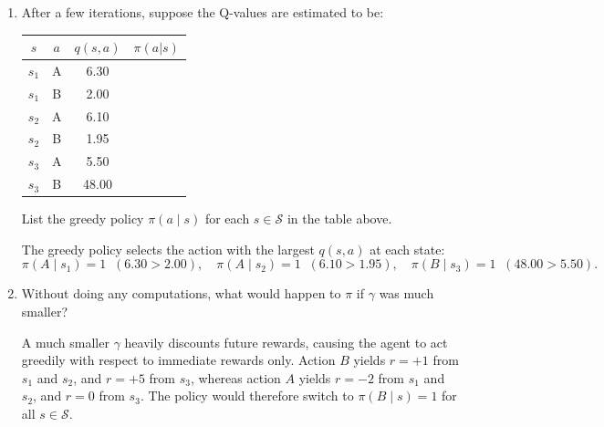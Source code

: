 \begin{enumerate}
\begin{solution}
\medskip
\noindent\textbf{Step 2: $q(s,a;0)$ from $q(\cdot;1)$.}

The greedy values at $t=1$ are:
\[
  \max_{a'} q(s_1, a'; 1) = \max(-2, 1) = 1, \quad
  \max_{a'} q(s_2, a'; 1) = 1, \quad
  \max_{a'} q(s_3, a'; 1) = \max(0, 5) = 5.
\]
\begin{align*}
  q(s_1, A; 0) &= -2 + 0.9\cdot 5 = -2 + 4.5 = 2.5 \\
  q(s_1, B; 0) &= \tfrac{1}{2}(1 + 0.9\cdot 1) + \tfrac{1}{2}(1 + 0.9\cdot 1) = 1.9 \\
  q(s_2, A; 0) &= -2 + 0.9\cdot 5 = 2.5 \\
  q(s_2, B; 0) &= \tfrac{1}{2}(1 + 0.9\cdot 1) + \tfrac{1}{2}(1 + 0.9\cdot 1) = 1.9 \\
  q(s_3, A; 0) &= 0 + 0.9\cdot\max_{a'} q(s_2, a'; 1) = 0.9\cdot 1 = 0.9 \\
  q(s_3, B; 0) &= 5 + 0.9\cdot\max_{a'} q(s_3, a'; 1) = 5 + 0.9\cdot 5 = 9.5
\end{align*}
\end{solution}

\item \points[2] After a few iterations, suppose the Q-values are estimated to be:
\renewcommand{\arraystretch}{1.7}
\setlength{\tabcolsep}{10pt}
\begin{table}[H]
  \centering
  \begin{tabular}{|c|c|c|c|}
    \hline
    $s$ & $a$ & $q(s,a)$ & $\pi(a|s)$\\\hline
    $s_1$ & A & 6.30 & \\\hline
    $s_1$ & B & 2.00 & \\\hline
    $s_2$ & A & 6.10 & \\\hline
    $s_2$ & B & 1.95 & \\\hline
    $s_3$ & A & 5.50 & \\\hline
    $s_3$ & B & 48.00 & \\\hline
  \end{tabular}
\end{table}
List the greedy policy $\pi(a \mid s)$ for each $s\in \mathcal{S}$ in the table above.

\begin{solution}
The greedy policy selects the action with the largest $q(s,a)$ at each state:
\[
  \pi(A \mid s_1) = 1 \;\; (6.30 > 2.00), \quad
  \pi(A \mid s_2) = 1 \;\; (6.10 > 1.95), \quad
  \pi(B \mid s_3) = 1 \;\; (48.00 > 5.50).
\]
\end{solution}

\item \points[2] Without doing any computations, what would happen to $\pi$ if $\gamma$ was much smaller?

\begin{solution}
A much smaller $\gamma$ heavily discounts future rewards, causing the agent to act greedily with respect to immediate rewards only. Action $B$ yields $r=+1$ from $s_1$ and $s_2$, and $r=+5$ from $s_3$, whereas action $A$ yields $r=-2$ from $s_1$ and $s_2$, and $r=0$ from $s_3$. The policy would therefore switch to $\pi(B \mid s) = 1$ for all $s \in \mathcal{S}$.
\end{solution}
\end{enumerate}
\clearpage
